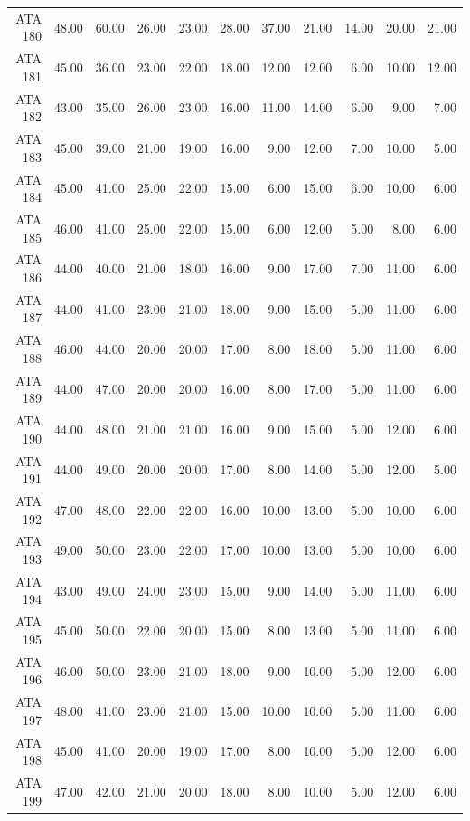\begin{landscape}
\begin{longtable}{rrrrrrrrrrr}
  ATA 180 & 48.00 & 60.00 & 26.00 & 23.00 & 28.00 & 37.00 & 21.00 & 14.00 & 20.00 & 21.00 \\ 
  ATA 181 & 45.00 & 36.00 & 23.00 & 22.00 & 18.00 & 12.00 & 12.00 & 6.00 & 10.00 & 12.00 \\ 
  ATA 182 & 43.00 & 35.00 & 26.00 & 23.00 & 16.00 & 11.00 & 14.00 & 6.00 & 9.00 & 7.00 \\ 
  ATA 183 & 45.00 & 39.00 & 21.00 & 19.00 & 16.00 & 9.00 & 12.00 & 7.00 & 10.00 & 5.00 \\ 
  ATA 184 & 45.00 & 41.00 & 25.00 & 22.00 & 15.00 & 6.00 & 15.00 & 6.00 & 10.00 & 6.00 \\ 
  ATA 185 & 46.00 & 41.00 & 25.00 & 22.00 & 15.00 & 6.00 & 12.00 & 5.00 & 8.00 & 6.00 \\ 
  ATA 186 & 44.00 & 40.00 & 21.00 & 18.00 & 16.00 & 9.00 & 17.00 & 7.00 & 11.00 & 6.00 \\ 
  ATA 187 & 44.00 & 41.00 & 23.00 & 21.00 & 18.00 & 9.00 & 15.00 & 5.00 & 11.00 & 6.00 \\ 
  ATA 188 & 46.00 & 44.00 & 20.00 & 20.00 & 17.00 & 8.00 & 18.00 & 5.00 & 11.00 & 6.00 \\ 
  ATA 189 & 44.00 & 47.00 & 20.00 & 20.00 & 16.00 & 8.00 & 17.00 & 5.00 & 11.00 & 6.00 \\ 
  ATA 190 & 44.00 & 48.00 & 21.00 & 21.00 & 16.00 & 9.00 & 15.00 & 5.00 & 12.00 & 6.00 \\ 
  ATA 191 & 44.00 & 49.00 & 20.00 & 20.00 & 17.00 & 8.00 & 14.00 & 5.00 & 12.00 & 5.00 \\ 
  ATA 192 & 47.00 & 48.00 & 22.00 & 22.00 & 16.00 & 10.00 & 13.00 & 5.00 & 10.00 & 6.00 \\ 
  ATA 193 & 49.00 & 50.00 & 23.00 & 22.00 & 17.00 & 10.00 & 13.00 & 5.00 & 10.00 & 6.00 \\ 
  ATA 194 & 43.00 & 49.00 & 24.00 & 23.00 & 15.00 & 9.00 & 14.00 & 5.00 & 11.00 & 6.00 \\ 
  ATA 195 & 45.00 & 50.00 & 22.00 & 20.00 & 15.00 & 8.00 & 13.00 & 5.00 & 11.00 & 6.00 \\ 
  ATA 196 & 46.00 & 50.00 & 23.00 & 21.00 & 18.00 & 9.00 & 10.00 & 5.00 & 12.00 & 6.00 \\ 
  ATA 197 & 48.00 & 41.00 & 23.00 & 21.00 & 15.00 & 10.00 & 10.00 & 5.00 & 11.00 & 6.00 \\ 
  ATA 198 & 45.00 & 41.00 & 20.00 & 19.00 & 17.00 & 8.00 & 10.00 & 5.00 & 12.00 & 6.00 \\ 
  ATA 199 & 47.00 & 42.00 & 21.00 & 20.00 & 18.00 & 8.00 & 10.00 & 5.00 & 12.00 & 6.00 \\ 

\end{longtable}
\end{landscape}

